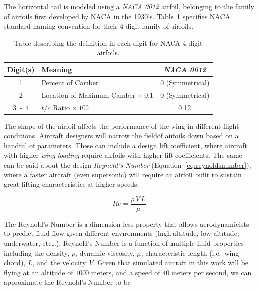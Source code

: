 The horizontal tail is modeled using a \textit{NACA 0012} airfoil, belonging to the family of airfoils first developed by NACA in the 1930's. Table~\ref{tbl:naca4digits} specifies NACA standard naming convention for their 4-digit family of airfoils.

\begin{table}[!ht]\label{tbl:naca4digits}
    \caption{Table describing the definition in each digit for NACA 4-digit airfoils.}
    \centering
    \begin{tabular}{clc}
        \toprule
        \textbf{Digit{(s)}} & \textbf{Meaning}                             & \textbf{\textit{NACA 0012}} \\
        \midrule
        1                   & Percent of Camber                            & 0 (Symmetrical)             \\
        2                   & Location of Maximum Camber \(\times \, 0.1\) & 0 (Symmetrical)             \\
        3~-~4               & \(t/c\) Ratio \(\times \, 100\)              & 0.12                        \\
        \bottomrule
    \end{tabular}
\end{table}

The shape of the airfoil affects the performance of the wing in different flight conditions. Aircraft designers will narrow the \"field\" of airfoils down based on a handful of parameters. These can include a design lift coefficient, where aircraft with higher \textit{wing-loading} require airfoils with higher lift coefficients. The same can be said about the design \textit{Reynold's Number} (Equation~\ref{eq:reynoldsnumber}), where a faster aircraft (even supersonic) will require an airfoil built to sustain great lifting characteristics at higher speeds.

\begin{equation}\label{eq:reynoldsnumber}
    Re = \frac{\rho \, V \, L}{\mu}
\end{equation}

The Reynold's Number is a dimension-less property that allows aerodynamicists to predict fluid flow given different environments (high-altitude, low-altitude, underwater, etc\ldots). Reynold's Number is a function of multiple fluid properties including the density, \( \rho \), dynamic viscosity, \( \mu \), characteristic length (i.e.\ wing chord), \(L\), and the velocity, \(V\). Given that simulated aircraft in this work will be flying at an altitude of \(1000\) meters, and a speed of \(40\) meters per second, we can approximate the Reynold's Number to be

